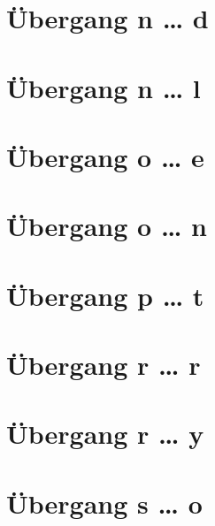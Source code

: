 \documentclass[a4paper,landscape]{article}
\begin{document}
\hspace*{-1ex}
\newpage

\section{Übergang n … d }

\hspace*{-1ex}
\newpage

\section{Übergang n … l }

\hspace*{-1ex}
\newpage

\section{Übergang o … e }

\hspace*{-1ex}
\newpage

\section{Übergang o … n }

\hspace*{-1ex}
\newpage

\section{Übergang p … t }

\hspace*{-1ex}
\newpage

\section{Übergang r … r }

\hspace*{-1ex}
\newpage

\section{Übergang r … y }

\hspace*{-1ex}
\newpage

\section{Übergang s … o }
\end{document}
